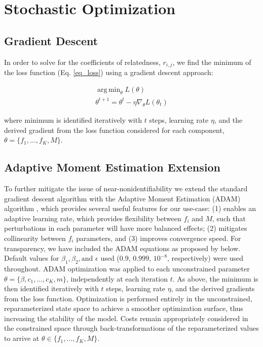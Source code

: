 \documentclass[a4paper, 12pt]{article}
\DeclareMathOperator*{\argmin}{arg\,min}
\begin{document}
\vspace{8mm}

\section{Stochastic Optimization}
\subsection{ Gradient Descent}

In order to solve for the coefficients of relatedness, $r_{i,j}$, we find the minimum of the loss function (Eq. \ref{eq_loss}) using a gradient descent approach:

\begin{align*}
\argmin_{\theta} L(\theta) \\
\theta^{t+1} = \theta^t - \eta \nabla_{\theta} L(\theta_t)
\end{align*}

\noindent where minimum is identified iteratively with $t$ steps, learning rate $\eta$, and the derived gradient from the loss function considered for each component,  $\theta = \{f_1, \dots, f_K, M\}$.

\subsection{Adaptive Moment Estimation Extension}
To further mitigate the issue of near-nonidentifiability we extend the standard gradient descent algorithm with the Adaptive Moment Estimation (ADAM) algorithm \cite{kingma2014adam}, which provides several useful features for our use-case: (1) enables an adaptive learning rate, which provides flexibility between $f_i$ and $M$, such that perturbations in each parameter will have more balanced effects; (2) mitigates collinearity between $f_i$ parameters, and (3) improves convergence speed. For transparency, we have included the ADAM equations as proposed by \cite{kingma2014adam} below. Default values for $\beta_1, \beta_2, \text{and } \epsilon$ used ($0.9$, $0.999$, $10^{-8}$, respectively) were used throughout. ADAM optimization was applied to each unconstrained parameter
$\theta = \{\beta, c_1, \dots, c_K, m\}$, independently at each iteration $t$. As above, the minimum is then identified iteratively with $t$ steps, learning rate $\eta$, and the derived gradients from the loss function. Optimization is performed entirely in the unconstrained, reparameterized state space to achieve a smoother optimization surface, thus increasing the stability of the model. Costs remain appropriately considered in the constrained space through back-transformations of the reparameterized values to arrive at $ \theta \in \{f_1, \dots,f_K, M\} $.
\end{document}
